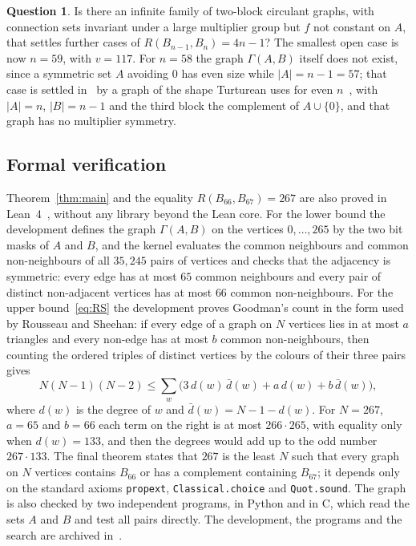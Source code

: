 \documentclass[11pt]{amsart}
\theoremstyle{definition}
\newtheorem{question}[theorem]{Question}
\theoremstyle{remark}
\numberwithin{equation}{section}
\begin{document}
\begin{question}
Is there an infinite family of two-block circulant graphs, with connection sets invariant under a large multiplier group but $f$ not constant on $A$, that settles further cases of $R(B_{n-1},B_n)=4n-1$? The smallest open case is now $n=59$, with $v=117$. For $n=58$ the graph $\Gamma(A,B)$ itself does not exist, since a symmetric set $A$ avoiding $0$ has even size while $|A|=n-1=57$; that case is settled in~\cite{Bh58} by a graph of the shape Turturean uses for even $n$~\cite{Tu}, with $|A|=n$, $|B|=n-1$ and the third block the complement of $A\cup\{0\}$, and that graph has no multiplier symmetry.
\end{question}

\subsection*{Formal verification}
Theorem~\ref{thm:main} and the equality $R(B_{66},B_{67})=267$ are also proved in Lean~4~\cite{MU}, without any library beyond the Lean core. For the lower bound the development defines the graph $\Gamma(A,B)$ on the vertices $0,\dots,265$ by the two bit masks of $A$ and $B$, and the kernel evaluates the common neighbours and common non-neighbours of all $35{,}245$ pairs of vertices and checks that the adjacency is symmetric: every edge has at most $65$ common neighbours and every pair of distinct non-adjacent vertices has at most $66$ common non-neighbours. For the upper bound~\eqref{eq:RS} the development proves Goodman's count in the form used by Rousseau and Sheehan: if every edge of a graph on $N$ vertices lies in at most $a$ triangles and every non-edge has at most $b$ common non-neighbours, then counting the ordered triples of distinct vertices by the colours of their three pairs gives
\[
N(N-1)(N-2)\le\sum_{w}\bigl(3\,d(w)\,\bar d(w)+a\,d(w)+b\,\bar d(w)\bigr),
\]
where $d(w)$ is the degree of $w$ and $\bar d(w)=N-1-d(w)$. For $N=267$, $a=65$ and $b=66$ each term on the right is at most $266\cdot265$, with equality only when $d(w)=133$, and then the degrees would add up to the odd number $267\cdot133$. The final theorem states that $267$ is the least $N$ such that every graph on $N$ vertices contains $B_{66}$ or has a complement containing $B_{67}$; it depends only on the standard axioms \texttt{propext}, \texttt{Classical.choice} and \texttt{Quot.sound}. The graph is also checked by two independent programs, in Python and in C, which read the sets $A$ and $B$ and test all pairs directly. The development, the programs and the search are archived in~\cite{Ar}.
\end{document}
